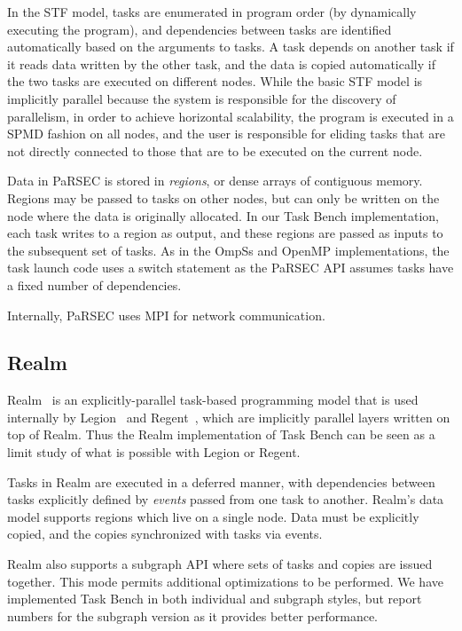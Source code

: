 In the STF model, tasks are enumerated in program order (by
dynamically executing the program), and dependencies between tasks are
identified automatically based on the arguments to tasks. A task
depends on another task if it reads data written by the other task,
and the data is copied automatically if the two tasks are executed on
different nodes. While the basic STF model is implicitly parallel
because the system is responsible for the discovery of parallelism, in
order to achieve horizontal scalability, the program is executed in a
SPMD fashion on all nodes, and the user is responsible for eliding
tasks that are not directly connected to those that are to be executed
on the current node.

Data in PaRSEC is stored in \emph{regions}, or dense arrays of
contiguous memory. Regions may be passed to tasks on other nodes, but
can only be written on the node where the data is originally
allocated. In our Task Bench implementation, each task writes to a
region as output, and these regions are passed as inputs to the
subsequent set of tasks. As in the OmpSs and OpenMP implementations,
the task launch code uses a switch statement as the PaRSEC API assumes
tasks have a fixed number of dependencies.


Internally, PaRSEC uses MPI for network communication.

\subsection{Realm}

Realm~\cite{Realm14} is an explicitly-parallel task-based programming
model that is used internally by Legion~\cite{Legion12} and
Regent~\cite{Regent15}, which are implicitly parallel layers written
on top of Realm. Thus the Realm implementation of Task Bench can be
seen as a limit study of what is possible with Legion or Regent.

Tasks in Realm are executed in a deferred manner, with dependencies
between tasks explicitly defined by \emph{events} passed from one task
to another. Realm's data model supports regions which live on a single
node. Data must be explicitly copied, and the copies synchronized with
tasks via events.

Realm also supports a subgraph API where sets of tasks and copies are
issued together. This mode permits additional optimizations to be
performed. We have implemented Task Bench in both individual and
subgraph styles, but report numbers for the subgraph version as it
provides better performance.

